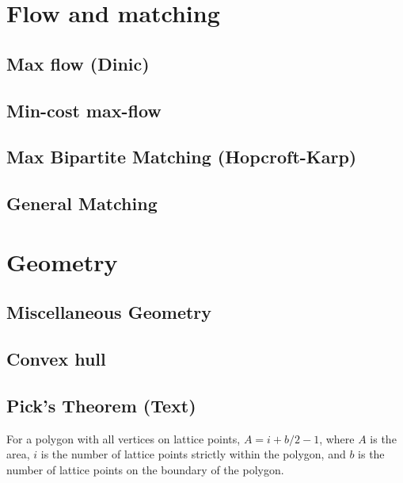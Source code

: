 \documentclass[12pt]{extarticle}
\begin{document}
\begin{multicols*}{2}
\setlength{\parskip}{0.0in}
\setlength{\parskip}{0.0in}
\section{Flow and matching}

\subsection{Max flow (Dinic)} %


\subsection{Min-cost max-flow}


\subsection{Max Bipartite Matching (Hopcroft-Karp)} %


\subsection{General Matching} %



\section{Geometry}

\subsection{Miscellaneous Geometry} %



\subsection{Convex hull} %


\subsection{Pick's Theorem (Text)} %
For a polygon with all vertices on lattice points, $A = i + b/2 - 1$, where $A$
is the area, $i$ is the number of lattice points strictly within the polygon,
and $b$ is the number of lattice points on the boundary of the polygon.


\end{multicols*}
\end{document}
